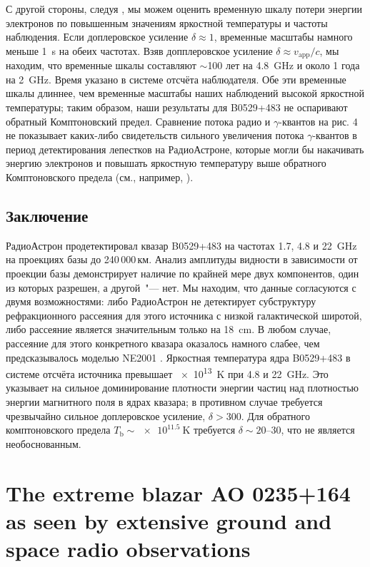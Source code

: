 С другой стороны, следуя \cite{Readhead_1994}, мы можем оценить временную шкалу потери энергии
электронов по повышенным значениям яркостной температуры и частоты наблюдения. Если доплеровское
усиление $\delta \approx 1$, временные масштабы намного меньше \SI{1}{\second} на обеих частотах.
Взяв допплеровское усиление $\delta\approx v_\text{app}/c$, мы находим, что временные шкалы
составляют $\sim$100 лет на \SI{4.8}{\GHz} и около 1 года на \SI{2}{\GHz}. Время указано в системе
отсчёта наблюдателя. Обе эти временные шкалы длиннее, чем временные масштабы наших наблюдений
высокой яркостной температуры; таким образом, наши результаты для B0529+483 не оспаривают обратный
Комптоновский предел. Сравнение потока радио и $\gamma$-квантов на рис. 4 не показывает каких-либо
свидетельств сильного увеличения потока $\gamma$-квантов в период детектирования лепестков на
РадиоАстроне, которые могли бы накачивать энергию электронов и повышать яркостную температуру выше
обратного Комптоновского предела (см., например, \cite{Readhead_1994,Kovalev_2016}).

\subsection{Заключение}

РадиоАстрон продетектировал квазар B0529+483 на частотах 1.7, 4.8 и \SI{22}{\GHz} на проекциях базы
до 240\,000\,км. Анализ амплитуды видности в зависимости от проекции базы
демонстрирует наличие по крайней мере двух компонентов, один из которых разрешен, а другой~"---
нет. Мы находим, что данные согласуются с двумя возможностями: либо РадиоАстрон не детектирует
субструктуру рефракционного рассеяния для этого источника с низкой галактической широтой, либо
рассеяние является значительным только на \SI{18}{\cm}. В любом случае, рассеяние для этого
конкретного квазара оказалось намного слабее, чем предсказывалось моделью NE2001
\cite{Cordes_2002}. Яркостная температура ядра B0529+483 в системе отсчёта источника превышает
\SI{e13}{\kelvin} при 4.8 и \SI{22}{\GHz}. Это указывает на сильное доминирование плотности энергии
частиц над плотностью энергии магнитного поля в ядрах квазара; в противном случае требуется
чрезвычайно сильное доплеровское усиление, $\delta > 300$. Для обратного комптоновского предела
$T_\text{b} \sim \SI{e11.5}{\kelvin}$ требуется $\delta \sim \text{20--30}$, что не является
необоснованным.


\section{The extreme blazar AO 0235+164 as seen by extensive ground and space radio observations}


